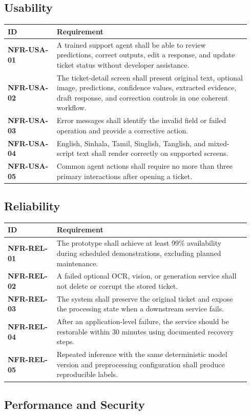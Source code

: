 \documentclass[10pt,letterpaper]{article}
\newcommand{\req}[1]{\textbf{#1}}
\newenvironment{requirements}{%
  \small\setlength{\tabcolsep}{4pt}%
  \begin{longtable}{|L{0.19\linewidth}|L{0.75\linewidth}|}
  \hline\textbf{ID} & \textbf{Requirement}\\\hline\endhead}{\hline\end{longtable}}
\newenvironment{templatebody}{\par\justifying\setlength{\emergencystretch}{3em}}{\par}
\begin{document}
\begin{templatebody}
\subsection{Usability}
\begin{requirements}
\req{NFR-USA-01} & A trained support agent shall be able to review predictions, correct outputs, edit a response, and update ticket status without developer assistance.\\
\req{NFR-USA-02} & The ticket-detail screen shall present original text, optional image, predictions, confidence values, extracted evidence, draft response, and correction controls in one coherent workflow.\\
\req{NFR-USA-03} & Error messages shall identify the invalid field or failed operation and provide a corrective action.\\
\req{NFR-USA-04} & English, Sinhala, Tamil, Singlish, Tanglish, and mixed-script text shall render correctly on supported screens.\\
\req{NFR-USA-05} & Common agent actions shall require no more than three primary interactions after opening a ticket.\\
\end{requirements}

\subsection{Reliability}
\begin{requirements}
\req{NFR-REL-01} & The prototype shall achieve at least 99\% availability during scheduled demonstrations, excluding planned maintenance.\\
\req{NFR-REL-02} & A failed optional OCR, vision, or generation service shall not delete or corrupt the stored ticket.\\
\req{NFR-REL-03} & The system shall preserve the original ticket and expose the processing state when a downstream service fails.\\
\req{NFR-REL-04} & After an application-level failure, the service should be restorable within 30 minutes using documented recovery steps.\\
\req{NFR-REL-05} & Repeated inference with the same deterministic model version and preprocessing configuration shall produce reproducible labels.\\
\end{requirements}

\subsection{Performance and Security}

\end{templatebody}
\end{document}

